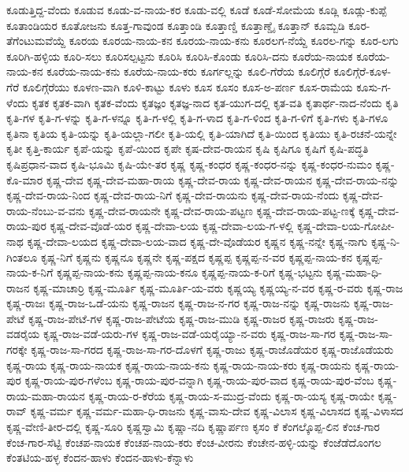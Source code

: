 ಕೂಡುತ್ತಿದ್ದ-ವೆಂದು
ಕೂಡುವ
ಕೂಡು-ವ-ನಾಯ-ಕರ
ಕೂಡು-ವಲ್ಲಿ
ಕೂಡೆ
ಕೂಡೆ-ಸೋಮೆಯ
ಕೂಡ್ಲಿ
ಕೂಡ್ಲು-ಕುಪ್ಪೆ
ಕೂತಾಂಡಿಯರ
ಕೂತೋಜನು
ಕೂತ್ತ-ಗಾವುಂಡ
ಕೂತ್ತಾಂಡಿ
ಕೂತ್ತಾಣ್ಡಿ
ಕೂತ್ತಾಣ್ಡೈ
ಕೂತ್ತಾನ್
ಕೂಮ್ಬಡಿ
ಕೂರ-ತೆಗೆಂಟುಮವೆಯ್ದೆ
ಕೂರಯ
ಕೂರಯ-ನಾಯ-ಕನ
ಕೂರಯ-ನಾಯ-ಕನು
ಕೂರಲಗ-ನೆಯ್ದೆ
ಕೂರಲ-ಗನ್ನು
ಕೂರ-ಲಗು
ಕೂರಿಗಿ-ಹಳ್ಳಿಯ
ಕೂರಿ-ಸಲು
ಕೂರಿಸಲ್ಪಟ್ಟನು
ಕೂರಿಸಿ
ಕೂರಿಸಿ-ಕೊಂಡು
ಕೂರಿಸಿ-ದನು
ಕೂರೆಯ-ನಾಯಕ
ಕೂರೆಯ-ನಾಯ-ಕನ
ಕೂರೆಯ-ನಾಯ-ಕನು
ಕೂರೆಯ-ನಾಯ-ಕರು
ಕೂರ್ಗಲ್ಲನ್ನು
ಕೂಲಿ-ಗೆರೆಯ
ಕೂಲಿಗ್ಗೆರೆ
ಕೂಲಿಗ್ಗೆರೆ-ಕೂಳ-ಗೆರೆ
ಕೂಲಿಗ್ಗೆರೆಯು
ಕೂಳಣ-ವಾಗಿ
ಕೂಳಿ-ಕಾಟ್ಟು
ಕೂಳು
ಕೂಸ
ಕೂಸಂ
ಕೂಸ-ಅ-ಪರ್ಣ
ಕೂಸ-ರಾಮೆಯ
ಕೂಸು-ಗ-ಳೆಂದು
ಕೃತಕ
ಕೃತಕ-ವಾಗಿ
ಕೃತಕ-ವೆಂದು
ಕೃತಜ್ಞಂ
ಕೃತಜ್ಞ-ನಾದ
ಕೃತ-ಯುಗ-ದಲ್ಲಿ
ಕೃತ-ವತಿ
ಕೃತಾರ್ಥ-ನಾದ-ನೆಂದು
ಕೃತಿ
ಕೃತಿ-ಗಳ
ಕೃತಿ-ಗ-ಳನ್ನು
ಕೃತಿ-ಗ-ಳನ್ನೂ
ಕೃತಿ-ಗ-ಳಲ್ಲಿ
ಕೃತಿ-ಗ-ಳಾದ
ಕೃತಿ-ಗ-ಳಿಂದ
ಕೃತಿ-ಗ-ಳಿಗೆ
ಕೃತಿ-ಗಳು
ಕೃತಿ-ಗಳೂ
ಕೃತಿನಾ
ಕೃತಿಯ
ಕೃತಿ-ಯನ್ನು
ಕೃತಿ-ಯಲ್ಲಾ-ಗಲೀ
ಕೃತಿ-ಯಲ್ಲಿ
ಕೃತಿ-ಯಾಗಿದೆ
ಕೃತಿ-ಯಿಂದ
ಕೃತಿಯು
ಕೃತಿ-ರಚನೆ-ಯನ್ನೇ
ಕೃತೀ
ಕೃತ್ತಿ-ಕಾರ್ಯ
ಕೃಪೆ-ಯನ್ನು
ಕೃಪೆ-ಯಿಂದ
ಕೃಪೇ
ಕೃಷ-ದೇವ-ರಾಯನ
ಕೃಷಿ
ಕೃಷಿಗೂ
ಕೃಷಿಗೆ
ಕೃಷಿ-ಪದ್ಧತಿ
ಕೃಷಿಪ್ರಧಾನ-ವಾದ
ಕೃಷಿ-ಭೂಮಿ
ಕೃಷಿ-ಯೇ-ತರ
ಕೃಷ್ಣ
ಕೃಷ್ಣ-ಕಂಧರ
ಕೃಷ್ಣ-ಕಂಧರ-ನನ್ನು
ಕೃಷ್ಣ-ಕಂಧರ-ನುಮಂ
ಕೃಷ್ಣ-ಕೊ-ಮಾರ
ಕೃಷ್ಣ-ದೇವ
ಕೃಷ್ಣ-ದೇವ-ಮಹಾ-ರಾಯ
ಕೃಷ್ಣ-ದೇವ-ರಾಯ
ಕೃಷ್ಣ-ದೇವ-ರಾಯನ
ಕೃಷ್ಣ-ದೇವ-ರಾಯ-ನನ್ನು
ಕೃಷ್ಣ-ದೇವ-ರಾಯ-ನಿಂದ
ಕೃಷ್ಣ-ದೇವ-ರಾಯ-ನಿಗೆ
ಕೃಷ್ಣ-ದೇವ-ರಾಯನು
ಕೃಷ್ಣ-ದೇವ-ರಾಯ-ನೆಂದು
ಕೃಷ್ಣ-ದೇವ-ರಾಯ-ನೆಂಬು-ವ-ವನು
ಕೃಷ್ಣ-ದೇವ-ರಾಯನೇ
ಕೃಷ್ಣ-ದೇವ-ರಾಯ-ಪಟ್ಟಣ
ಕೃಷ್ಣ-ದೇವ-ರಾಯ-ಪಟ್ಟ-ಣಕ್ಕೆ
ಕೃಷ್ಣ-ದೇವ-ರಾಯ-ಪುರ
ಕೃಷ್ಣ-ದೇವ-ವೊಡೆ-ಯರ
ಕೃಷ್ಣ-ದೇವಾ-ಲಯ
ಕೃಷ್ಣ-ದೇವಾ-ಲಯ-ಗ-ಳಲ್ಲಿ
ಕೃಷ್ಣ-ದೇವಾ-ಲಯ-ಗೋಪೀ-ನಾಥ
ಕೃಷ್ಣ-ದೇವಾ-ಲಯದ
ಕೃಷ್ಣ-ದೇವಾ-ಲಯ-ವಾದ
ಕೃಷ್ಣ-ದೇ-ವೊಡೆಯರ
ಕೃಷ್ಣನ
ಕೃಷ್ಣ-ನನ್ನೇ
ಕೃಷ್ಣ-ನಾಗು
ಕೃಷ್ಣ-ನಿ-ಗಿಂತಲೂ
ಕೃಷ್ಣ-ನಿಗೆ
ಕೃಷ್ಣನು
ಕೃಷ್ಣನೂ
ಕೃಷ್ಣನೇ
ಕೃಷ್ಣ-ಪಕ್ಷದ
ಕೃಷ್ಣಪ್ಪ
ಕೃಷ್ಣಪ್ಪ-ನ-ವರ
ಕೃಷ್ಣಪ್ಪ-ನಾಯ-ಕನ
ಕೃಷ್ಣಪ್ಪ-ನಾಯ-ಕ-ನಿಗೆ
ಕೃಷ್ಣಪ್ಪ-ನಾಯ-ಕನು
ಕೃಷ್ಣಪ್ಪ-ನಾಯ-ಕನೂ
ಕೃಷ್ಣಪ್ಪ-ನಾಯ-ಕ-ರಿಗೆ
ಕೃಷ್ಣ-ಭಟ್ಟನು
ಕೃಷ್ಣ-ಮಹಾ-ಧಿ-ರಾಜನ
ಕೃಷ್ಣ-ಮಾಚಾರ್ರಿ
ಕೃಷ್ಣ-ಮೂರ್ತಿ
ಕೃಷ್ಣ-ಮೂರ್ತಿ-ಯ-ವರು
ಕೃಷ್ಣಯ್ಯ
ಕೃಷ್ಣಯ್ಯ-ನ-ವರ
ಕೃಷ್ಣ-ರ-ವರು
ಕೃಷ್ಣ-ರಾಜ
ಕೃಷ್ಣ-ರಾಜಃ
ಕೃಷ್ಣ-ರಾಜ-ಒಡೆ-ಯನು
ಕೃಷ್ಣ-ರಾಜನ
ಕೃಷ್ಣ-ರಾಜ-ನ-ಗರ
ಕೃಷ್ಣ-ರಾಜ-ನನ್ನು
ಕೃಷ್ಣ-ರಾಜನು
ಕೃಷ್ಣ-ರಾಜ-ಪೇಟೆ
ಕೃಷ್ಣ-ರಾಜ-ಪೇಟೆ-ಗಳ
ಕೃಷ್ಣ-ರಾಜ-ಪೇಟೆಯ
ಕೃಷ್ಣ-ರಾಜ-ಮುಡಿ
ಕೃಷ್ಣ-ರಾಜರ
ಕೃಷ್ಣ-ರಾಜರು
ಕೃಷ್ಣ-ರಾಜ-ವಡರೈಯ
ಕೃಷ್ಣ-ರಾಜ-ವಡೆ-ಯರು-ಗಳ
ಕೃಷ್ಣ-ರಾಜ-ವಡೆ-ಯರೈಯ್ಯಾ-ನ-ವರು
ಕೃಷ್ಣ-ರಾಜ-ಸಾ-ಗರ
ಕೃಷ್ಣ-ರಾಜ-ಸಾ-ಗರಕ್ಕೇ
ಕೃಷ್ಣ-ರಾಜ-ಸಾ-ಗರದ
ಕೃಷ್ಣ-ರಾಜ-ಸಾ-ಗರ-ದೊಳಗೆ
ಕೃಷ್ಣ-ರಾಜು
ಕೃಷ್ಣ-ರಾಜೊಡೆಯರ
ಕೃಷ್ಣ-ರಾಜೊಡೆಯರು
ಕೃಷ್ಣ-ರಾಯ
ಕೃಷ್ಣ-ರಾಯ-ನಾಯಕ
ಕೃಷ್ಣ-ರಾಯ-ನಾಯ-ಕನು
ಕೃಷ್ಣ-ರಾಯ-ನಾಯ-ಕರು
ಕೃಷ್ಣ-ರಾಯನು
ಕೃಷ್ಣ-ರಾಯ-ಪುರ
ಕೃಷ್ಣ-ರಾಯ-ಪುರ-ಗಳೆಂಬ
ಕೃಷ್ಣ-ರಾಯ-ಪುರ-ವನ್ನಾಗಿ
ಕೃಷ್ಣ-ರಾಯ-ಪುರ-ವಾದ
ಕೃಷ್ಣ-ರಾಯ-ಪುರ-ವೆಂಬ
ಕೃಷ್ಣ-ರಾಯ-ಮಹಾ-ರಾಯನ
ಕೃಷ್ಣ-ರಾಯ-ರ-ಕೆರೆಯ
ಕೃಷ್ಣ-ರಾಯ-ಸ-ಮುದ್ರ-ವೆಂದು
ಕೃಷ್ಣ-ರಾ-ಯಸ್ಯ
ಕೃಷ್ಣ-ರಾಯೇ
ಕೃಷ್ಣ-ರಾವ್
ಕೃಷ್ಣ-ವರ್ಮ
ಕೃಷ್ಣ-ವರ್ಮ-ಮಹಾ-ಧಿ-ರಾಜನು
ಕೃಷ್ಣ-ವಾಸು-ದೇವ
ಕೃಷ್ಣ-ವಿಲಾಸ
ಕೃಷ್ಣ-ವಿಲಾಸದ
ಕೃಷ್ಣ-ವಿಳಾಸದ
ಕೃಷ್ಣ-ವೇಣಿ-ತೀರ-ದಲ್ಲಿ
ಕೃಷ್ಣ-ಸೂರಿ
ಕೃಷ್ಣಸ್ವಾಮಿ
ಕೃಷ್ಣಾ-ನದಿ
ಕೃಷ್ಣಾರ್ಪಣ
ಕೃಸಂ
ಕೆ
ಕೆಂಗಲ್ಕೊಪ್ಪ-ಲಿನ
ಕೆಂಚ-ಗಾರ
ಕೆಂಚ-ಗಾರ-ಸೆಟ್ಟಿ
ಕೆಂಚಪ-ನಾಯಕ
ಕೆಂಚಪ-ನಾಯ-ಕರು
ಕೆಂಚ-ವೀರನು
ಕೆಂಚೇನ-ಹಳ್ಳಿ-ಯನ್ನು
ಕೆಂಜೆಡೆದೊಂಗಲ
ಕೆಂತಟಿಯ-ಹಳ್ಳ
ಕೆಂದನ-ಹಾಳು
ಕೆಂದನ-ಹಾಳು-ಕೆನ್ನಾಳು
